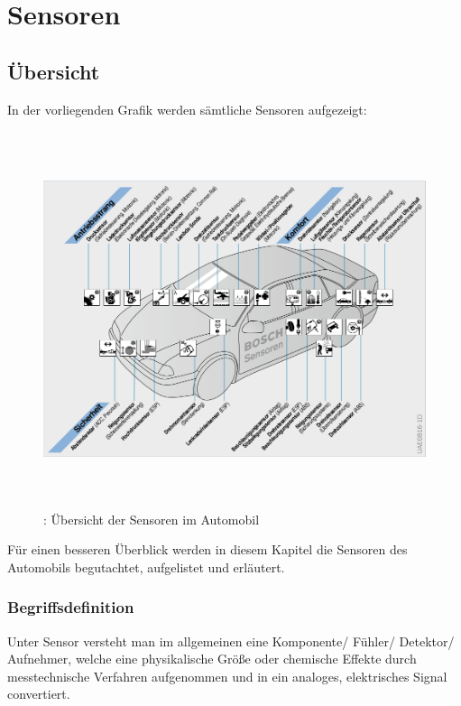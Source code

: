 \graphicspath{{./Images/Kapitel5/}}
	\section{Sensoren}
		\subsection{Übersicht} 
		
		In der vorliegenden Grafik werden sämtliche Sensoren aufgezeigt:
			\begin{figure}
				\centering
				\includegraphics[width=15cm, height=11cm] {Images/Kapitel5/sensor_uebersicht.png}
				\caption{\cite{TS01}: Übersicht der Sensoren im Automobil}
			\end{figure}
			
			\begin{flushleft}	
			
			Für einen besseren Überblick werden in diesem Kapitel die Sensoren des Automobils begutachtet, aufgelistet und erläutert.	
			
			\end{flushleft}	
			
				\subsubsection{Begriffsdefinition}
					
					Unter Sensor versteht man im allgemeinen eine Komponente/ Fühler/ Detektor/ Aufnehmer, welche eine physikalische Größe oder chemische Effekte durch messtechnische Verfahren aufgenommen und in ein analoges, elektrisches Signal convertiert.

